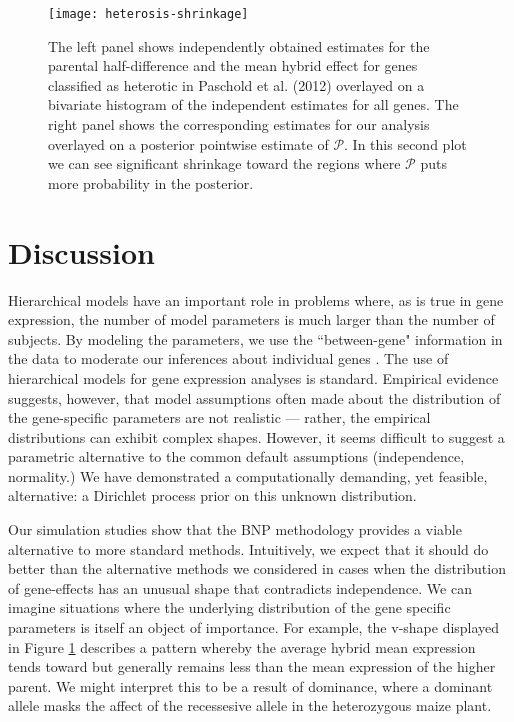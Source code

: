 
\begin{figure}[h!]
\centering
\texttt{[image: heterosis-shrinkage]}
\begin{minipage}{.8\textwidth}
\caption{\small The left panel shows independently obtained estimates for the parental half-difference and the mean hybrid effect for genes classified as heterotic in Paschold et al. (2012) overlayed on a bivariate histogram of the independent estimates for all genes. The right
panel shows the corresponding estimates for our analysis overlayed on a posterior pointwise estimate of $\mathcal{P}$. In this second plot we can see significant shrinkage toward the regions where $\mathcal{P}$ puts more probability in the posterior.}
\label{het-shrink}
\end{minipage}
\end{figure}

\section{Discussion}
\label{sec:discussion}
Hierarchical models have an important role in problems where, as is true in gene expression, the number of model parameters is much larger than the number of subjects. By modeling the parameters, we use the ``between-gene" information in the data to moderate our inferences about individual genes . The use of hierarchical models for gene expression analyses is standard. Empirical evidence suggests, however, that model assumptions often made about the distribution of the gene-specific parameters are not realistic --- rather, the empirical distributions can exhibit complex shapes. However, it seems difficult to suggest a parametric alternative to the common default assumptions (independence, normality.) We have demonstrated a computationally demanding, yet feasible, alternative: a Dirichlet process prior on this unknown distribution.

Our simulation studies show that the BNP methodology provides a viable alternative to more standard methods. Intuitively, we expect that it should do better than the alternative methods we considered in cases when the distribution of gene-effects has an unusual shape that contradicts independence. We can imagine situations where the underlying distribution of the gene specific parameters is itself an object of importance. For example, the v-shape displayed in Figure \ref{het-shrink} describes a pattern whereby the average hybrid mean expression tends toward but generally remains less than the mean expression of the higher parent. We might interpret this to be a result of dominance, where a dominant allele masks the affect of the recessesive allele in the heterozygous maize plant.

